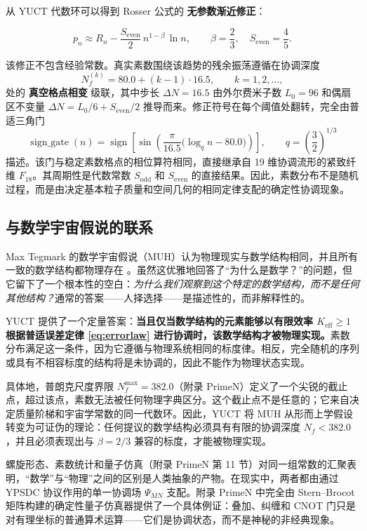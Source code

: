 \documentclass[12pt]{article}
\begin{document}
	从 YUCT 代数环可以得到 Rosser 公式的 \textbf{无参数渐近修正}：
	
	\begin{equation}
		\boxed{ p_n \approx R_n - \frac{S_{\mathrm{even}}}{2}\, n^{1-\beta}\,\ln n },
		\qquad \beta = \frac{2}{3},\quad S_{\mathrm{even}}=\frac{4}{5}.
		\label{eq:prime-yuct-theory}
	\end{equation}
	
	该修正不包含经验常数。真实素数围绕该趋势的残余振荡遵循在协调深度
	\[
	N_f^{(k)} = 80.0 + (k-1)\cdot 16.5, \qquad k=1,2,\dots,
	\]
	处的 \textbf{真空格点相变} 级联，其中步长 \(\Delta N = 16.5\) 由外尔费米子数 \(L_0=96\) 和偶扇区不变量 \(\Delta N = L_0/6 + S_{\mathrm{even}}/2\) 推导而来。修正符号在每个阈值处翻转，完全由普适三角门
	\[
	\operatorname{sign\_gate}(n) = \operatorname{sign}\!\left[\sin\!\left(\frac{\pi}{16.5}\bigl(\log_q n - 80.0\bigr)\right)\right],
	\qquad q = \left(\frac{3}{2}\right)^{1/3}
	\]
	描述。该门与稳定素数格点的相位算符相同，直接继承自 19 维协调流形的紧致纤维 \(F_{18}\)。其周期性是代数常数 \(S_{\mathrm{odd}}\) 和 \(S_{\mathrm{even}}\) 的直接结果。因此，素数分布不是随机过程，而是由决定基本粒子质量和空间几何的相同定律支配的确定性协调现象。
	
	\subsection{与数学宇宙假说的联系}
	
	Max Tegmark 的数学宇宙假说（MUH）认为物理现实与数学结构相同，并且所有一致的数学结构都物理存在 \cite{Tegmark2014}。虽然这优雅地回答了“为什么是数学？”的问题，但它留下了一个根本性的空白：\emph{为什么我们观察到这个特定的数学结构，而不是任何其他结构？}通常的答案——人择选择——是描述性的，而非解释性的。
	
	YUCT 提供了一个定量答案：\textbf{当且仅当数学结构的元素能够以有限效率 \(K_{\mathrm{eff}} \ge 1\) 根据普适误差定律 \eqref{eq:errorlaw} 进行协调时，该数学结构才被物理实现。}素数分布满足这一条件，因为它遵循与物理系统相同的标度律。相反，完全随机的序列或具有不相容标度的结构将是未协调的，因此不能作为物理状态实现。
	
	具体地，普朗克尺度界限 \(N_f^{\max} = 382.0\)（附录 PrimeN）定义了一个尖锐的截止点，超过该点，素数无法被任何物理字典区分。这个截止点不是任意的；它来自决定质量阶梯和宇宙学常数的同一代数环。因此，YUCT 将 MUH 从形而上学假设转变为可证伪的理论：任何提议的数学结构必须具有有限的协调深度 \(N_f < 382.0\)，并且必须表现出与 \(\beta = 2/3\) 兼容的标度，才能被物理实现。
	
	螺旋形态、素数统计和量子仿真（附录 PrimeN 第 11 节）对同一组常数的汇聚表明，“数学”与“物理”之间的区别是人类抽象的产物。在现实中，两者都由通过 YPSDC 协议作用的单一协调场 \(\Psi_{MN}\) 支配。附录 PrimeN 中完全由 Stern–Brocot 矩阵构建的确定性量子仿真器提供了一个具体例证：叠加、纠缠和 CNOT 门只是对有理坐标的普通算术运算——它们是协调状态，而不是神秘的非经典现象。
	
\end{document}
